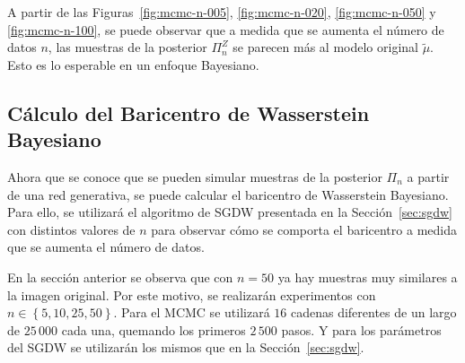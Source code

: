 A partir de las Figuras~\ref{fig:mcmc-n-005}, \ref{fig:mcmc-n-020}, \ref{fig:mcmc-n-050} y \ref{fig:mcmc-n-100}, se puede observar que a medida que se aumenta el número de datos $n$, las muestras de la posterior $\Pi^Z_n$ se parecen más al modelo original $\tilde\mu$. Esto es lo esperable en un enfoque Bayesiano.

\subsection{Cálculo del Baricentro de Wasserstein Bayesiano}\label{ssec:calc-bwb}  %

Ahora que se conoce que se pueden simular muestras de la posterior $\Pi_n$ a partir de una red generativa, se puede calcular el baricentro de Wasserstein Bayesiano. Para ello, se utilizará el algoritmo de SGDW presentada en la Sección~\ref{sec:sgdw} con distintos valores de $n$ para observar cómo se comporta el baricentro a medida que se aumenta el número de datos.

En la sección anterior se observa que con $n = 50$ ya hay muestras muy similares a la imagen original. Por este motivo, se realizarán experimentos con $n \in \left\{ 5, 10, 25, 50 \right\}$. Para el MCMC se utilizará $16$ cadenas diferentes de un largo de $25\,000$ cada una, quemando los primeros $2\,500$ pasos.
Y para los parámetros del SGDW se utilizarán los mismos que en la Sección~\ref{sec:sgdw}.



